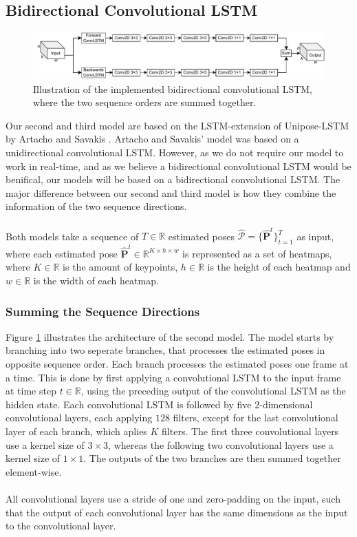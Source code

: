 \documentclass[./main.tex]{subfiles}
\begin{document}
\subsection{Bidirectional Convolutional LSTM}
\begin{figure}[htbp]
    \centering
    \includegraphics[width=\textwidth]{./entities/bi_conv_lstm.pdf}
    \caption{Illustration of the implemented bidirectional convolutional LSTM, where the two sequence orders are summed together.}
    \label{fig:bi_conv_lstm}
\end{figure}

\noindent Our second and third model are based on the LSTM-extension of Unipose-LSTM by Artacho and Savakis \cite{https://doi.org/10.48550/arxiv.2001.08095}. Artacho and Savakis' model was based on a unidirectional convolutional LSTM. However, as we do not require our model to work in real-time, and as we believe a bidirectional convolutional LSTM would be benifical, our models will be based on a bidirectional convolutional LSTM. The major difference between our second and third model is how they combine the information of the two sequence directions.
\\
\\
Both models take a sequence of $T \in \mathbb{R}$ estimated poses $\hat{\mathcal{P}} = \{\hat{\bm{P}}^t\}_{t = 1} ^T$ as input, where each estimated pose $\hat{\bm{P}}^t \in \mathbb{R}^{K \times h \times w}$ is represented as a set of heatmaps, where $K \in \mathbb{R}$ is the amount of keypoints, $h \in \mathbb{R}$ is the height of each heatmap and $w \in \mathbb{R}$ is the width of each heatmap. 

\subsubsection{Summing the Sequence Directions}
Figure \ref{fig:bi_conv_lstm} illustrates the architecture of the second model. The model starts by branching into two seperate branches, that processes the estimated poses in opposite sequence order. Each branch processes the estimated poses one frame at a time. This is done by first applying a convolutional LSTM to the input frame at time step $t \in \mathbb{R}$, using the preceding output of the convolutional LSTM as the hidden state. Each convolutional LSTM is followed by five 2-dimensional convolutional layers, each applying $128$ filters, except for the last convolutional layer of each branch, which aplies $K$ filters. The first three convolutional layers use a kernel size of $3 \times 3$, whereas the following two convolutional layers use a kernel size of $1 \times 1$. The outputs of the two branches are then summed together element-wise.
\\
\\
All convolutional layers use a stride of one and zero-padding on the input, such that the output of each convolutional layer has the same dimensions as the input to the convolutional layer.
\end{document}
